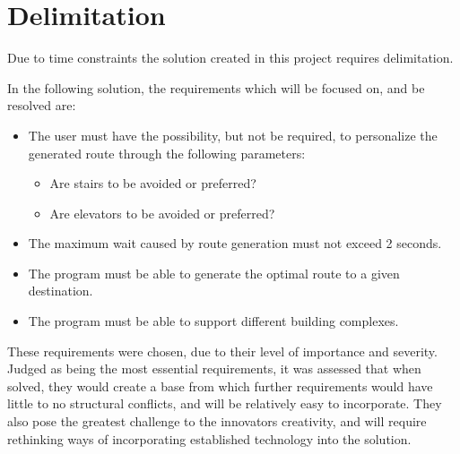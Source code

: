 
\section{Delimitation}\label{sec:delimination}

Due to time constraints the solution created in this project requires delimitation.

In the following solution, the requirements which will be focused on, and be resolved are:

\begin{itemize}
  \item The user must have the possibility, but not be required, to personalize the generated route through the following parameters:
      \begin{itemize}
        \item Are stairs to be avoided or preferred?
        \item Are elevators to be avoided or preferred?
      \end{itemize}
  \item The maximum wait caused by route generation must not exceed 2 seconds.

  \item The program must be able to generate the optimal route to a given destination.

  \item The program must be able to support different building complexes.

\end{itemize}

These requirements were chosen, due to their level of importance and severity. Judged as being the most essential requirements, it was assessed that when solved, they would create a base from which further requirements would have little to no structural conflicts, and will be relatively easy to incorporate. They also pose the greatest challenge to the innovators creativity, and will require rethinking ways of incorporating established technology into the solution.